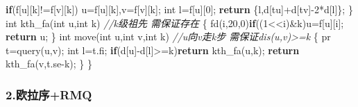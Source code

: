\documentclass[
]{article}
\newenvironment{Shaded}{}{}
\newcommand{\CommentTok}[1]{\textcolor[rgb]{0.38,0.63,0.69}{\textit{#1}}}
\newcommand{\ControlFlowTok}[1]{\textcolor[rgb]{0.00,0.44,0.13}{\textbf{#1}}}
\newcommand{\DataTypeTok}[1]{\textcolor[rgb]{0.56,0.13,0.00}{#1}}
\newcommand{\DecValTok}[1]{\textcolor[rgb]{0.25,0.63,0.44}{#1}}
\newcommand{\NormalTok}[1]{#1}
\begin{document}
\begin{Shaded}
\begin{Highlighting}[]
            \ControlFlowTok{if}\NormalTok{(f[u][k]!=f[v][k])}
\NormalTok{                u=f[u][k],v=f[v][k];}
        \DataTypeTok{int}\NormalTok{ l=f[u][}\DecValTok{0}\NormalTok{];}
        \ControlFlowTok{return}\NormalTok{ \{l,d[tu]+d[tv]{-}}\DecValTok{2}\NormalTok{*d[l]\};}
\NormalTok{    \}}
    \DataTypeTok{int}\NormalTok{ kth\_fa(}\DataTypeTok{int}\NormalTok{ u,}\DataTypeTok{int}\NormalTok{ k) }\CommentTok{//k级祖先 需保证存在}
\NormalTok{    \{}
\NormalTok{        fd(i,}\DecValTok{20}\NormalTok{,}\DecValTok{0}\NormalTok{)}\ControlFlowTok{if}\NormalTok{((}\DecValTok{1}\NormalTok{\textless{}\textless{}i)\&k)u=f[u][i];}
        \ControlFlowTok{return}\NormalTok{ u;}
\NormalTok{    \}}
    \DataTypeTok{int}\NormalTok{ move(}\DataTypeTok{int}\NormalTok{ u,}\DataTypeTok{int}\NormalTok{ v,}\DataTypeTok{int}\NormalTok{ k) }\CommentTok{//u向v走k步 需保证dis(u,v)\textgreater{}=k}
\NormalTok{    \{}
\NormalTok{        pr t=query(u,v); }\DataTypeTok{int}\NormalTok{ l=t.fi;}
        \ControlFlowTok{if}\NormalTok{(d[u]{-}d[l]\textgreater{}=k)}\ControlFlowTok{return}\NormalTok{ kth\_fa(u,k);}
        \ControlFlowTok{return}\NormalTok{ kth\_fa(v,t.se{-}k);}
\NormalTok{    \}}
\NormalTok{\}}
\end{Highlighting}
\end{Shaded}

\hypertarget{ux6b27ux62c9ux5e8frmq}{%
\subsubsection{2.欧拉序+RMQ}\label{ux6b27ux62c9ux5e8frmq}}
\end{document}
